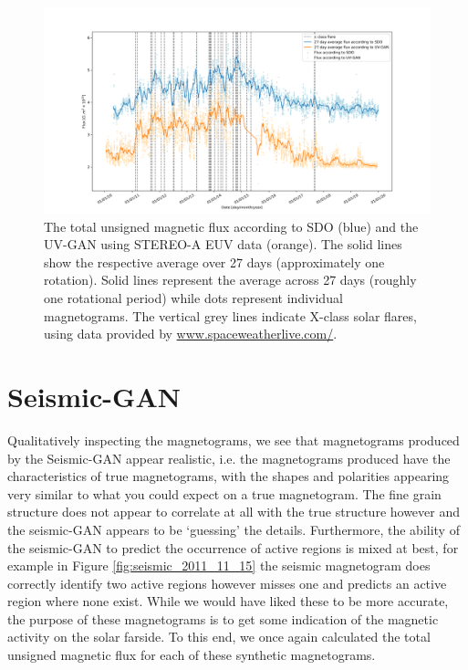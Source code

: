 \documentclass[11pt,a4paper,onecolumn]{report}
\begin{document}
\begin{figure}[t]
  \centering
  \includegraphics[width=\linewidth]{Flux_SDO_UV-GAN_average.png}

  \caption{The total unsigned magnetic flux according to SDO (blue) and the
  UV-GAN using STEREO-A EUV data (orange). The solid lines show the respective
  average over 27 days (approximately one rotation). Solid lines represent the
  average across 27 days (roughly one rotational period) while dots represent
  individual magnetograms. The vertical grey lines indicate X-class solar
  flares, using data provided by \url{www.spaceweatherlive.com/}.}
  \label{fig:flux_sdo_uv}
\end{figure}

\section{Seismic-GAN}
Qualitatively inspecting the magnetograms, we see that magnetograms produced by
the Seismic-GAN appear realistic, i.e. the magnetograms produced have the
characteristics of true magnetograms, with the shapes and polarities appearing
very similar to what you could expect on a true magnetogram. The fine grain
structure does not appear to correlate at all with the true structure however
and the seismic-GAN appears to be `guessing' the details. Furthermore, the
ability of the seismic-GAN to predict the occurrence of active regions is mixed
at best, for example in Figure \ref{fig:seismic_2011_11_15} the seismic
magnetogram does correctly identify two active regions however misses one and
predicts an active region where none exist. While we would have liked these to
be more accurate, the purpose of these magnetograms is to get some indication of
the magnetic activity on the solar farside. To this end, we once again
calculated the total unsigned magnetic flux for each of these synthetic
magnetograms.\\
\end{document}
